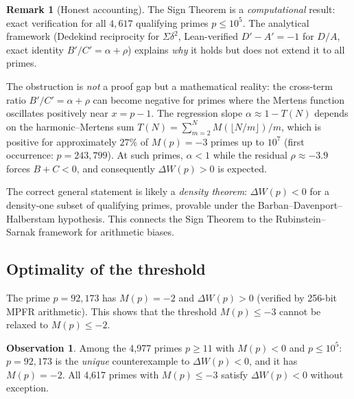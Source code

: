 \documentclass[11pt]{article}
\theoremstyle{definition}
\newtheorem{remark}[theorem]{Remark}
\newtheorem{observation}[theorem]{Observation}
\begin{document}
\begin{remark}[Honest accounting]\label{rem:honest-sign}
The Sign Theorem is a \emph{computational} result: exact
verification for all $4{,}617$ qualifying primes $p \le 10^5$.
The analytical framework (Dedekind reciprocity for $\Sigma\delta^2$,
Lean-verified $D' - A' = -1$ for $D/A$, exact identity
$B'/C' = \alpha + \rho$) explains \emph{why} it holds but
does not extend it to all primes.

The obstruction is \emph{not} a proof gap but a mathematical
reality: the cross-term ratio $B'/C' = \alpha + \rho$ can
become negative for primes where the Mertens function
oscillates positively near $x = p-1$.  The regression slope
$\alpha \approx 1 - T(N)$ depends on the harmonic--Mertens
sum $T(N) = \sum_{m=2}^{N} M(\lfloor N/m\rfloor)/m$, which
is positive for approximately $27\%$ of $M(p) = -3$ primes
up to $10^7$ (first occurrence: $p = 243{,}799$).
At such primes, $\alpha < 1$ while the residual $\rho \approx -3.9$
forces $B + C < 0$, and consequently $\Delta W(p) > 0$ is expected.

The correct general statement is likely a \emph{density theorem}:
$\Delta W(p) < 0$ for a density-one subset of qualifying primes,
provable under the Barban--Davenport--Halberstam hypothesis.
This connects the Sign Theorem to the Rubinstein--Sarnak framework
for arithmetic biases.
\end{remark}

\subsection{Optimality of the threshold}\label{sec:sign-optimal}

The prime $p = 92{,}173$ has $M(p) = -2$ and
$\Delta W(p) > 0$ (verified by 256-bit MPFR arithmetic).  This
shows that the threshold $M(p) \le -3$ cannot be relaxed to
$M(p) \le -2$.

\begin{observation}\label{obs:threshold}
Among the 4,977 primes $p \ge 11$ with $M(p) < 0$ and $p \le 10^5$:
$p = 92{,}173$ is the \emph{unique} counterexample to
$\Delta W(p) < 0$, and it has $M(p) = -2$.  All 4,617 primes with
$M(p) \le -3$ satisfy $\Delta W(p) < 0$ without exception.
\end{observation}



\end{document}
